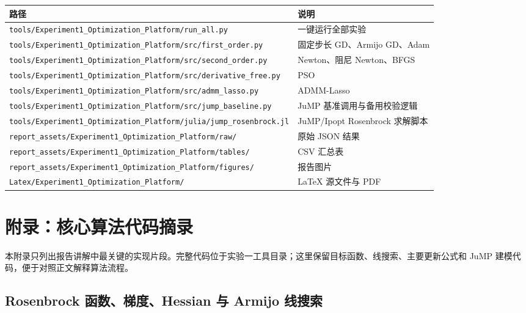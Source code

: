 \documentclass[UTF8,a4paper,12pt,fontset=none]{ctexart}
\begin{document}
\begingroup
\scriptsize
\begin{longtable}{p{}p{}}
\toprule
路径 & 说明 \\
\midrule
\texttt{tools/Experiment1\_Optimization\_Platform/run\_all.py} & 一键运行全部实验 \\
\texttt{tools/Experiment1\_Optimization\_Platform/src/first\_order.py} & 固定步长 GD、Armijo GD、Adam \\
\texttt{tools/Experiment1\_Optimization\_Platform/src/second\_order.py} & Newton、阻尼 Newton、BFGS \\
\texttt{tools/Experiment1\_Optimization\_Platform/src/derivative\_free.py} & PSO \\
\texttt{tools/Experiment1\_Optimization\_Platform/src/admm\_lasso.py} & ADMM-Lasso \\
\texttt{tools/Experiment1\_Optimization\_Platform/src/jump\_baseline.py} & JuMP 基准调用与备用校验逻辑 \\
\texttt{tools/Experiment1\_Optimization\_Platform/julia/jump\_rosenbrock.jl} & JuMP/Ipopt Rosenbrock 求解脚本 \\
\texttt{report\_assets/Experiment1\_Optimization\_Platform/raw/} & 原始 JSON 结果 \\
\texttt{report\_assets/Experiment1\_Optimization\_Platform/tables/} & CSV 汇总表 \\
\texttt{report\_assets/Experiment1\_Optimization\_Platform/figures/} & 报告图片 \\
\texttt{Latex/Experiment1\_Optimization\_Platform/} & LaTeX 源文件与 PDF \\
\bottomrule
\end{longtable}
\endgroup

\newpage
\section{附录：核心算法代码摘录}

本附录只列出报告讲解中最关键的实现片段。完整代码位于实验一工具目录；这里保留目标函数、线搜索、主要更新公式和 JuMP 建模代码，便于对照正文解释算法流程。

\subsection{Rosenbrock 函数、梯度、Hessian 与 Armijo 线搜索}
\end{document}
